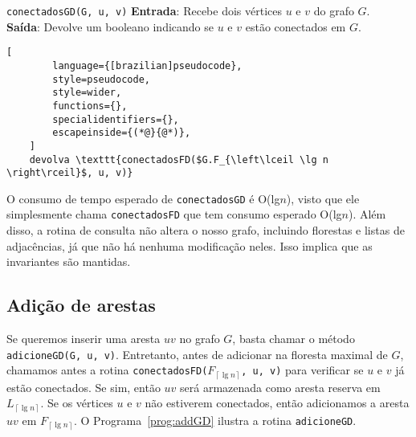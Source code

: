 \begin{programruledcaption}{\texttt{conectadosGD(G, u, v)} \label{prog:connectedGD}}
    \noindent\textbf{Entrada}: Recebe dois vértices $u$ e $v$ do grafo $G$. \\
    \textbf{Saída}: Devolve um booleano indicando se $u$ e $v$ estão conectados em $G$.
    \vspace{-0.5\baselineskip}
    \begin{lstlisting}[
        language={[brazilian]pseudocode},
        style=pseudocode,
        style=wider,
        functions={},
        specialidentifiers={},
        escapeinside={(*@}{@*)},
    ]
    devolva \texttt{conectadosFD($G.F_{\left\lceil \lg n \right\rceil}$, u, v)}
    \end{lstlisting}
    \vspace{-0.5\baselineskip}
\end{programruledcaption}

O consumo de tempo esperado de \texttt{conectadosGD} é O(lg$n$), visto que ele simplesmente chama \texttt{conectadosFD} que tem consumo esperado O(lg$n$). Além disso, a rotina de consulta não altera o nosso grafo, incluindo florestas e listas de adjacências, já que não há nenhuma modificação neles. Isso implica que as invariantes são mantidas. 

\subsection{Adição de arestas}
\label{sec:code-edge-addition}

Se queremos inserir uma aresta $uv$ no grafo $G$, basta chamar o método \texttt{adicioneGD(G, u, v)}. Entretanto, antes de adicionar na floresta maximal de $G$, chamamos antes a rotina \texttt{conectadosFD($F_{\left\lceil \lg n \right\rceil}$, u, v)} para verificar se $u$ e $v$ já estão conectados. Se sim, então $uv$ será armazenada como aresta reserva em $L_{\left\lceil \lg n \right\rceil}$. Se os vértices $u$ e $v$ não estiverem conectados, então adicionamos a aresta $uv$ em $F_{\left\lceil \lg n \right\rceil}$. O Programa~\ref{prog:addGD} ilustra a rotina \texttt{adicioneGD}.

